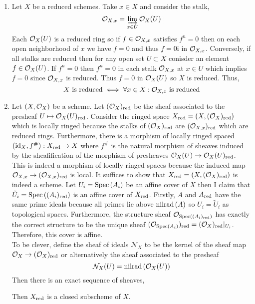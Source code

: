 \documentclass[12pt]{article}
\begin{document}
\begin{enumerate}
\item 
Let $X$ be a reduced schemes. Take $x \in X$ and consider the stalk,
\[ \mathcal{O}_{X, x} = \varinjlim_{x \in U} \mathcal{O}_{X}(U) \]
Each $\mathcal{O}_{X}(U)$ is a reduced ring so if $f \in \mathcal{O}_{X, x}$ satisfies $f^n = 0$ then on each open neighborhood of $x$ we have $f = 0$ and thus $f = 0$i in $\mathcal{O}_{X, x}$. Conversely, if all stalks are reduced then for any open set $U \subset X$ conisder an element $f \in \mathcal{O}_{X}(U)$. If $f^n = 0$ then $f^n = 0$ in each stalk $\mathcal{O}_{X, x}$ at $x \in U$ which implies $f = 0$ since $\mathcal{O}_{X, x}$ is reduced. Thus $f = 0$ in $\mathcal{O}_{X}(U)$ so $X$ is reduced. Thus,
\[ X \text{ is reduced} \iff \forall x \in X : \mathcal{O}_{X, x} \text{ is reduced} \]

\item Let $(X, \mathcal{O}_{X})$ be a scheme. Let $(\mathcal{O}_{X})_{\mathrm{red}}$ be the sheaf associated to the presheaf $U \mapsto \mathcal{O}_{X}(U)_{\mathrm{red}}$. Consider the ringed space $X_{\mathrm{red}} = (X, (\mathcal{O}_{X})_{\mathrm{red}})$ which is locally ringed because the stalks of $(\mathcal{O}_{X})_{\mathrm{red}}$ are $(\mathcal{O}_{X, x})_{\mathrm{red}}$ which are reduced rings. Furthermore, there is a morphism of locally ringed spaced $(\mathrm{id}_X, f^\#) : X_{\mathrm{red}} \to X$ where $f^\#$ is the natural morphism of sheaves induced by the sheafification of the morphism of presheaves $\mathcal{O}_{X}(U) \to \mathcal{O}_{X}(U)_{\mathrm{red}}$. This is indeed a morphism of locally ringed spaces because the induced map $\mathcal{O}_{X, x} \to (\mathcal{O}_{X, x})_{\mathrm{red}}$ is local. It suffices to show that $X_{\mathrm{red}} = (X, (\mathcal{O}_{X})_{\mathrm{red}})$ is indeed a scheme. Let $U_i = \mathrm{Spec}\left( A_i \right)$ be an affine cover of $X$ then I claim that $\tilde{U}_i = \mathrm{Spec}\left( (A_i)_{\mathrm{red}} \right)$ is an affine cover of $X_{\mathrm{red}}$. Firstly, $A$ and $A_{\mathrm{red}}$ have the same prime ideals because all primes lie above $\mathrm{nilrad}\left( A \right)$ so $U_i = \tilde{U}_i$ as topological spaces. Furthermore, the structure sheaf $\mathcal{O}_{\mathrm{Spec}\left( (A_i)_{\mathrm{red}} \right)}$ has exactly the correct structure to be the unique sheaf $(\mathcal{O}_{\mathrm{Spec}\left( A_i \right)})_{\mathrm{red}} = (\mathcal{O}_{X})_{\mathrm{red}}|_{U_i}$. Therefore, this cover is affine. 
\bigskip\\
To be clever, define the sheaf of ideals $\mathcal{N}_X$ to be the kernel of the sheaf map $\mathcal{O}_{X} \to (\mathcal{O}_{X})_{\mathrm{red}}$ or alternatively the sheaf associated to the presheaf 
\[ \mathcal{N}_X(U) = \mathrm{nilrad}\left( \mathcal{O}_{X}(U) \right) \] 
Then there is an exact sequence of sheaves,
\begin{center}
\end{center}
Then $X_{\mathrm{red}}$ is a closed subscheme of $X$. 


\end{enumerate}
\end{document}
